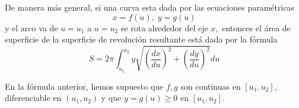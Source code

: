 De manera más general, si una curva esta dada por las ecuaciones param\'etricas
$$
x=f(u), \; y=g(u)
$$ y el arco va de $u=u_{1}$ a $u=u_{2}$ se rota alrededor del eje $x,$ entonces el área de superficie de la superficie de revoluci\'on resultante está dada por la f\'ormula
\begin{equation}
 \label{36.3}
 S=2\pi\int_{u_{1}}^{u_{2}}y\sqrt{\left( \dfrac{dx}{du} \right)^{2}+\left( \dfrac{dy}{du} \right)^{2}}du
\end{equation}
 

En la f\'ormula anterior, hemos supuesto que $f,g$ son continuas en $[u_{1},u_{2}],$ diferenciable en $\left( u_{1},u_{2} \right)$ y que $y=g(u)\geq 0$ en $[u_{1},u_{2}].$
